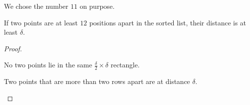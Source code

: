 \begin{remark}
    \begin{minipage}[t]{0.55\linewidth}
        We chose the number $11$ on purpose.

        \begin{claim}
            If two points are at least $12$ positions apart in the sorted list, their distance is at least $\delta$.
        \end{claim}

        \begin{proof}
            {~~~}

            \begin{listu}
                \item No two points lie in the same $\frac{\delta}{2} \times \delta$ rectangle.

                \item Two points that are more than two rows apart are at distance $\delta$.
            \end{listu}
        \end{proof}
    \end{minipage}
    \hfill
    \begin{minipage}[t]{0.4\linewidth}
        \begin{center}  \end{center}
    \end{minipage}
\end{remark}

